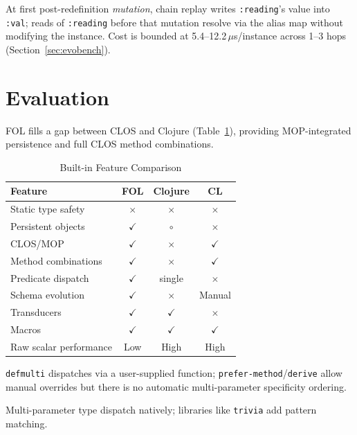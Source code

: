 \documentclass[sigconf,nonacm]{acmart}
\begin{document}
\noindent At first post-redefinition \emph{mutation}, chain replay writes \texttt{:reading}'s value into \texttt{:val}; reads of \texttt{:reading} before that mutation resolve via the alias map without modifying the instance.
Cost is bounded at 5.4--12.2\,$\mu$s/instance across 1--3 hops (Section~\ref{sec:evobench}).

\section{Evaluation}
\label{sec:evaluation}
FOL fills a gap between CLOS and Clojure (Table~\ref{tab:specificity-comp}), providing MOP-integrated persistence and full CLOS method combinations.

\begin{table}[htbp]
\centering
\caption{Built-in Feature Comparison}
\label{tab:specificity-comp}
\small
\begin{threeparttable}
    \begin{tabular}{lccc}
    \toprule
    \textbf{Feature} & \textbf{FOL} & \textbf{Clojure} & \textbf{CL} \\
    \midrule
    Static type safety & $\times$ & $\times$ & $\times$ \\
    Persistent objects & $\checkmark$\tnote{d} & $\circ$\tnote{c} & $\times$ \\
    CLOS/MOP & $\checkmark$ & $\times$ & $\checkmark$ \\
    Method combinations & $\checkmark$ & $\times$ & $\checkmark$ \\
    Predicate dispatch & $\checkmark$ & single\tnote{a} & $\times$\tnote{b} \\
    Schema evolution & $\checkmark$\tnote{e} & $\times$ & Manual \\
    Transducers & $\checkmark$ & $\checkmark$ & $\times$ \\
    Macros & $\checkmark$ & $\checkmark$ & $\checkmark$ \\
    Raw scalar performance & Low\tnote{f} & High & High \\
    \bottomrule
    \end{tabular}
    \begin{tablenotes}
        \footnotesize
        \item[a] \texttt{defmulti} dispatches via a user-supplied function; \texttt{prefer-method}/\texttt{derive} allow manual overrides but there is no automatic multi-parameter specificity ordering.
    \item[b] Multi-parameter type dispatch natively; libraries like \texttt{trivia} add pattern matching.

\end{tablenotes}
\end{threeparttable}
\end{table}
\end{document}
